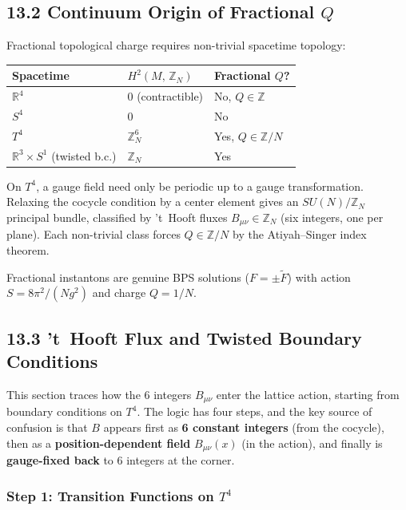\documentclass[12pt,a4paper]{article}
\begin{document}
\subsection*{13.2 Continuum Origin of Fractional $Q$}

Fractional topological charge requires non-trivial spacetime topology:

\begin{table}[H]
\centering
\begin{tabular}{|l|l|l|}
\hline
Spacetime & $H^2(M,\,\mathbb{Z}_N)$ & Fractional $Q$? \\
\hline
$\mathbb{R}^4$ & 0 (contractible) & No, $Q\in\mathbb{Z}$ \\
$S^4$ & 0 & No \\
$T^4$ & $\mathbb{Z}_N^6$ & Yes, $Q\in\mathbb{Z}/N$ \\
$\mathbb{R}^3\times S^1$ (twisted b.c.) & $\mathbb{Z}_N$ & Yes \\
\hline
\end{tabular}
\end{table}

On $T^4$, a gauge field need only be periodic up to a gauge transformation.
Relaxing the cocycle condition by a center element gives an $SU(N)/\mathbb{Z}_N$ principal bundle,
classified by 't~Hooft fluxes $B_{\mu\nu}\in\mathbb{Z}_N$ (six integers, one per plane).
Each non-trivial class forces $Q\in\mathbb{Z}/N$ by the Atiyah--Singer index theorem.

Fractional instantons are genuine BPS solutions ($F=\pm\tilde F$) with action
$S = 8\pi^2/(Ng^2)$ and charge $Q=1/N$.

\subsection*{13.3 't~Hooft Flux and Twisted Boundary Conditions}

This section traces how the 6 integers $B_{\mu\nu}$ enter the lattice action,
starting from boundary conditions on $T^4$.
The logic has four steps, and the key source of confusion is that
$B$ appears first as \textbf{6 constant integers} (from the cocycle),
then as a \textbf{position-dependent field} $B_{\mu\nu}(x)$ (in the action),
and finally is \textbf{gauge-fixed back} to 6 integers at the corner.

\subsubsection*{Step 1: Transition Functions on $T^4$}
\end{document}
